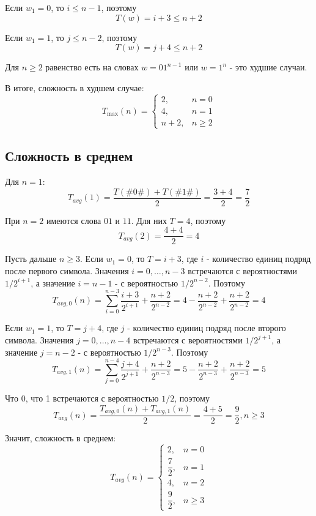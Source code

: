 \documentclass[12pt]{article}
\begin{document}
Если $w_1=0$, то $i\leq n-1$, поэтому
\[
T(w)=i+3\leq n+2
\]

Если $w_1=1$, то $j\leq n-2$, поэтому
\[
T(w)=j+4\leq n+2
\]

Для $n\geq 2$ равенство есть на словах $w=01^{n-1}$ или $w=1^n$ - это худшие случаи.

В итоге, сложность в худшем случае:
\[
T_{\max}(n)=
\begin{cases}
2, & n=0\\
4, & n=1\\
n+2, & n\geq 2
\end{cases}
\]

\subsection*{Сложность в среднем}

Для $n=1$:
\[
T_{avg}(1)
=\frac{T(\#0\#)+T(\#1\#)}{2}=\frac{3+4}{2}
=\frac{7}{2}
\]

При $n=2$ имеются слова $01$ и $11$. Для них $T=4$, поэтому
\[
T_{avg}(2)=\frac{4+4}{2}=4
\]

Пусть дальше $n\geq 3$. Если $w_1=0$, то $T=i+3$, где $i$ -
количество единиц подряд после первого символа. Значения
$i=0,\ldots,n-3$ встречаются с вероятностями
$1/2^{i+1}$, а значение $i=n-1$ - с вероятностью
$1/2^{n-2}$. Поэтому
\[
T_{avg,0}(n)
=\sum_{i=0}^{n-3}\frac{i+3}{2^{i+1}}
  +\frac{n+2}{2^{n-2}}
=4-\frac{n+2}{2^{n-2}}
  +\frac{n+2}{2^{n-2}}=4
\]

Если $w_1=1$, то $T=j+4$, где $j$ -
количество единиц подряд после второго символа.
Значения $j=0,\ldots,n-4$ встречаются с вероятностями
$1/2^{j+1}$, а значение $j=n-2$ - с вероятностью
$1/2^{n-3}$. Поэтому
\[
T_{avg,1}(n)
=\sum_{j=0}^{n-4}\frac{j+4}{2^{j+1}}
  +\frac{n+2}{2^{n-3}}
=5-\frac{n+2}{2^{n-3}}
  +\frac{n+2}{2^{n-3}}
=5
\]

Что 0, что 1 встречаются с вероятностью $1/2$, поэтому
\[
T_{avg}(n)
=\frac{T_{avg,0}(n)
       +T_{avg,1}(n)}{2}
=\frac{4+5}{2}
=\frac{9}{2}, n\geq 3
\]

Значит, сложность в среднем:
\[
T_{avg}(n)=
\begin{cases}
2, & n=0\\
\dfrac{7}{2}, & n=1\\
4, & n=2\\
\dfrac{9}{2}, & n\geq 3
\end{cases}
\]
\end{document}

